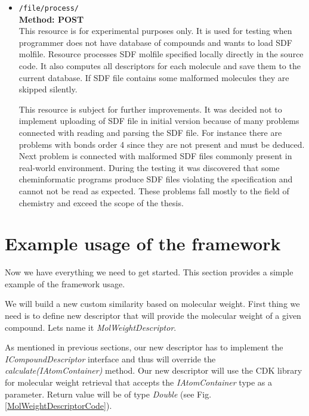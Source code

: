 \documentclass[thesis=M,english]{FITthesis}[2012/10/20]
\begin{document}
\begin{itemize}
\item \texttt{/file/process/} \\
\textbf{Method: POST} \\ 
This resource is for experimental purposes only. It is used for testing when programmer does not have database of compounds and wants to load SDF molfile. Resource processes SDF molfile specified locally directly in the source code. It also computes all descriptors for each molecule and save them to the current database. If SDF file contains some malformed molecules they are skipped silently. 

This resource is subject for further improvements. It was decided not to implement uploading of SDF file in initial version because of many problems connected with reading and parsing the SDF file. For instance there are problems with bonds order 4 since they are not present and must be deduced. Next problem is connected with malformed SDF files commonly present in real-world environment. During the testing it was discovered that some cheminformatic programs produce SDF files violating the specification and cannot not be read as expected. These problems fall mostly to the field of chemistry and exceed the scope of the thesis. 
\end{itemize}











\section{Example usage of the framework}
Now we have everything we need to get started. This section provides a simple example of the framework usage.

We will build a new custom similarity based on molecular weight. First thing we need is to define new descriptor that will provide the molecular weight of a given compound. Lets name it \textit{MolWeightDescriptor}.

As mentioned in previous sections, our new descriptor has to implement the \textit{ICompoundDescriptor} interface and thus will override the \textit{calculate(IAtomContainer)} method. Our new descriptor will use the CDK library for molecular weight retrieval that accepts the \textit{IAtomContainer} type as a parameter. Return value will be of type \textit{Double} (see Fig. \ref{MolWeightDescriptorCode}).
\end{document}
